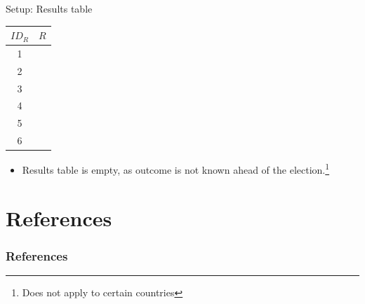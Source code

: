 \documentclass{beamer}
\begin{document}
\begin{frame}{Setup: Results table}
	\begin{center}
		\begin{tabular}{|c|c|}
			\hline
			$ID_R$ & $R$ \\
			\hline
			1 & \\
			2 & \\
			3 & \\
			4 & \\
			5 & \\
			6 & \\
			\hline
		\end{tabular}
	\end{center}

	\begin{itemize}
		\item Results table is empty, as outcome is not known ahead of
			the election.\footnote{Does not apply to certain
			countries}
	\end{itemize}
\end{frame}

\section{References}

\begin{frame}[allowframebreaks]
	\frametitle{References}
	\printbibliography


\end{frame}
\end{document}
